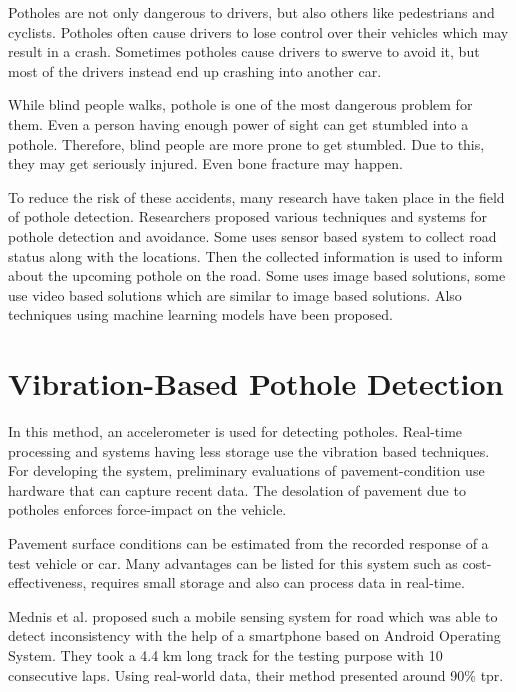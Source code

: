     Potholes are not only dangerous to drivers, but also others like pedestrians and cyclists. Potholes often cause drivers to lose control over their vehicles which may result in a crash. Sometimes potholes cause drivers to swerve to avoid it, but most of the drivers instead end up crashing into another car\cite{romanjul19}.
    
    While blind people walks, pothole is one of the most dangerous problem for them. Even a person having enough power of sight can get stumbled into a pothole. Therefore, blind people are more prone to get stumbled. Due to this, they may get seriously injured. Even bone fracture may happen.
    
    To reduce the risk of these accidents, many research have taken place in the field of pothole detection. Researchers proposed various techniques and systems for pothole detection and avoidance. Some uses sensor based system to collect road status along with the locations. Then the collected information is used to inform about the upcoming pothole on the road. Some uses image based solutions, some use video based solutions which are similar to image based solutions. Also techniques using machine learning models have been proposed.
    
\clearpage
\section{Vibration-Based Pothole Detection}
    In this method, an accelerometer is used for detecting potholes. Real-time processing and systems having less storage use the vibration based techniques. For developing the system, preliminary evaluations of pavement-condition\cite{yu06} use hardware that can capture recent data. The desolation of pavement due to potholes enforces force-impact on the vehicle.
    
    Pavement surface conditions can be estimated from the recorded response of a test vehicle or car\cite{kim14}. Many advantages can be listed for this system such as cost-effectiveness, requires small storage and also can process data in real-time\cite{kim14}.
    
    Mednis et al. proposed such a mobile sensing system for road\cite{rao16} which was able to detect inconsistency with the help of a smartphone based on Android Operating System\cite{mednis11,rao16}. They took a 4.4 km long track for the testing purpose with 10 consecutive laps. Using real-world data, their method presented around 90\% \acrfull{tpr}\cite{kim14}.
    
